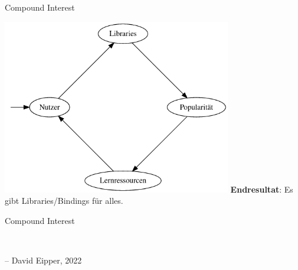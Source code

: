 \documentclass{beamer}
\begin{document}
\begin{frame}{Compound Interest}
\begin{center}
\includegraphics[width=100mm]{assets/circle.png}
\textbf{Endresultat}: Es gibt Libraries/Bindings f\"ur alles.
\end{center}
\end{frame}

\begin{frame}{Compound Interest}
\begin{center}
{ \large {}}\\
\end{center}
-- David Eipper, 2022
\end{frame}

\end{document}
